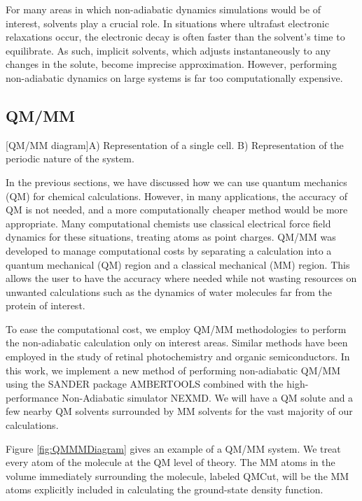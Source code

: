 For many areas in which non-adiabatic dynamics simulations would be of interest, solvents play a crucial role. \cite{bagchi1989dynamics,woo2005solvent}
In situations where ultrafast electronic relaxations occur, the electronic decay is often faster than the solvent's time to equilibrate.
As such, implicit solvents, which adjusts instantaneously to any changes in the solute, become imprecise approximation. However, performing non-adiabatic dynamics on large systems is far too computationally expensive.

\subsection{QM/MM}
\begin{multiFigure} 
  [QM/MM diagram]{A) Representation of a single cell. B) Representation of the periodic nature of the system.}
  \label{fig:QMMMDiagram}
\end{multiFigure}
\bigskip

In the previous sections, we have discussed how we can use quantum mechanics (QM) for chemical calculations. However, in many applications, the accuracy of QM is not needed, and a more computationally cheaper method would be more appropriate. Many computational chemists use classical electrical force field dynamics for these situations, treating atoms as point charges. QM/MM was developed to manage computational costs by separating a calculation into a quantum mechanical (QM) region and a classical mechanical (MM) region.\cite{warshel1976theoretical,Karplus2014} This allows the user to have the accuracy where needed while not wasting resources on unwanted calculations such as the dynamics of water molecules far from the protein of interest.

To ease the computational cost, we employ QM/MM methodologies to perform the non-adiabatic calculation only on interest areas. Similar methods have been employed in the study of retinal photochemistry and organic semiconductors. \cite{weingart2012modelling,demoulin2017fine,heck2015multi,bayliss1954solvent} In this work, we implement a new method of performing non-adiabatic QM/MM using the SANDER package AMBERTOOLS combined with the high-performance Non-Adiabatic simulator NEXMD.
We will have a QM solute and a few nearby QM solvents surrounded by MM solvents for the vast majority of our calculations.

Figure \ref{fig:QMMMDiagram} gives an example of a QM/MM system.
We treat every atom of the molecule at the QM level of theory. The MM atoms in the volume immediately surrounding the molecule, labeled QMCut, will be the MM atoms explicitly included in calculating the ground-state density function. 

